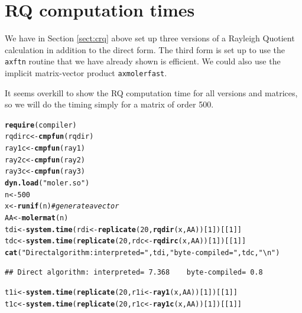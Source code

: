 \documentclass[10pt]{article}\usepackage[]{graphicx}\usepackage[]{color}
\makeatletter
\newcommand{\hlnum}[1]{\textcolor[rgb]{0.686,0.059,0.569}{#1}}%
\newcommand{\hlstr}[1]{\textcolor[rgb]{0.192,0.494,0.8}{#1}}%
\newcommand{\hlcom}[1]{\textcolor[rgb]{0.678,0.584,0.686}{\textit{#1}}}%
\newcommand{\hlstd}[1]{\textcolor[rgb]{0.345,0.345,0.345}{#1}}%
\newcommand{\hlkwb}[1]{\textcolor[rgb]{0.69,0.353,0.396}{#1}}%
\newcommand{\hlkwd}[1]{\textcolor[rgb]{0.737,0.353,0.396}{\textbf{#1}}}%
\newenvironment{kframe}{%
 \def\at@end@of@kframe{}%
 \ifinner\ifhmode%
  \def\at@end@of@kframe{\end{minipage}}%
  \begin{minipage}{\columnwidth}%
 \fi\fi%
 \def\FrameCommand##1{\hskip\@totalleftmargin \hskip-\fboxsep
 \colorbox{shadecolor}{##1}\hskip-\fboxsep
     \hskip-\linewidth \hskip-\@totalleftmargin \hskip\columnwidth}%
 \MakeFramed {\advance\hsize-\width
   \@totalleftmargin\z@ \linewidth\hsize
   \@setminipage}}%
 {\par\unskip\endMakeFramed%
 \at@end@of@kframe}
\newenvironment{knitrout}{}{} %
\newcommand{\code}[1]{{\tt #1}}
\makeatother
\begin{document}
\section{RQ computation times}

We have in Section \ref{sect:crq} above set up three versions of a Rayleigh 
Quotient calculation in addition to the direct form. The third 
form is set up to use the \code{axftn} routine that we have 
already shown is efficient. We could also use the
implicit matrix-vector product \code{axmolerfast}.

It seems overkill to show the RQ computation time for all versions
and matrices, so we will do the timing simply for a matrix of 
order 500.

\begin{knitrout}\scriptsize
{}\color{fgcolor}\begin{kframe}
\begin{alltt}
\hlkwd{require}\hlstd{(compiler)}
\hlstd{rqdirc}\hlkwb{<-}\hlkwd{cmpfun}\hlstd{(rqdir)}
\hlstd{ray1c}\hlkwb{<-}\hlkwd{cmpfun}\hlstd{(ray1)}
\hlstd{ray2c}\hlkwb{<-}\hlkwd{cmpfun}\hlstd{(ray2)}
\hlstd{ray3c}\hlkwb{<-}\hlkwd{cmpfun}\hlstd{(ray3)}
\hlkwd{dyn.load}\hlstd{(}\hlstr{"moler.so"}\hlstd{)}
  \hlstd{n}\hlkwb{<-}\hlnum{500}
  \hlstd{x}\hlkwb{<-}\hlkwd{runif}\hlstd{(n)} \hlcom{# generate a vector }
  \hlstd{AA}\hlkwb{<-}\hlkwd{molermat}\hlstd{(n)}
  \hlstd{tdi}\hlkwb{<-}\hlkwd{system.time}\hlstd{(rdi}\hlkwb{<-}\hlkwd{replicate}\hlstd{(}\hlnum{20}\hlstd{,}\hlkwd{rqdir}\hlstd{(x, AA))[}\hlnum{1}\hlstd{])[[}\hlnum{1}\hlstd{]]}
  \hlstd{tdc}\hlkwb{<-}\hlkwd{system.time}\hlstd{(}\hlkwd{replicate}\hlstd{(}\hlnum{20}\hlstd{,rdc}\hlkwb{<-}\hlkwd{rqdirc}\hlstd{(x, AA))[}\hlnum{1}\hlstd{])[[}\hlnum{1}\hlstd{]]}
  \hlkwd{cat}\hlstd{(}\hlstr{"Direct algorithm: interpreted="}\hlstd{,tdi,}\hlstr{"   byte-compiled="}\hlstd{,tdc,}\hlstr{"\textbackslash{}n"}\hlstd{)}
\end{alltt}
\begin{verbatim}
## Direct algorithm: interpreted= 7.368    byte-compiled= 0.8
\end{verbatim}
\begin{alltt}
  \hlstd{t1i}\hlkwb{<-}\hlkwd{system.time}\hlstd{(}\hlkwd{replicate}\hlstd{(}\hlnum{20}\hlstd{,r1i}\hlkwb{<-}\hlkwd{ray1}\hlstd{(x, AA))[}\hlnum{1}\hlstd{])[[}\hlnum{1}\hlstd{]]}
  \hlstd{t1c}\hlkwb{<-}\hlkwd{system.time}\hlstd{(}\hlkwd{replicate}\hlstd{(}\hlnum{20}\hlstd{,r1c}\hlkwb{<-}\hlkwd{ray1c}\hlstd{(x, AA))[}\hlnum{1}\hlstd{])[[}\hlnum{1}\hlstd{]]}

\end{alltt}
\end{kframe}
\end{knitrout}
\end{document}
